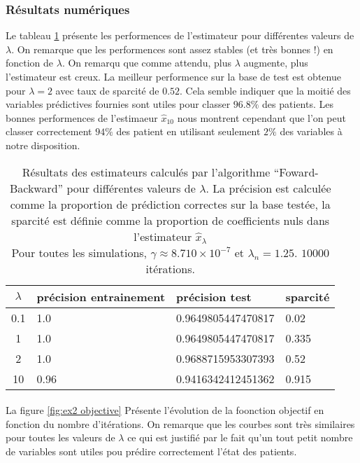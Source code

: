 \documentclass{article}
\newcommand{\xhat}{{\hat{x}}}
\begin{document}
\subsubsection{Résultats numériques}
Le tableau \ref{table:resultats ex2} présente les performences de l'estimateur pour différentes valeurs de $\lambda$. On remarque que les performences sont assez stables (et très bonnes !) en fonction de $\lambda$. On remarqu que comme attendu, plus $\lambda$ augmente, plus l'estimateur est creux. La meilleur performence sur la base de test est obtenue pour $\lambda = 2$ avec taux de sparcité de $0.52$. Cela semble indiquer que la moitié des variables prédictives fournies sont utiles pour classer $96.8\%$ des patients. Les bonnes performences de l'estimaeur $\xhat_10$ nous montrent cependant que l'on peut classer correctement $94\%$ des patient en utilisant seulement $2\%$ des variables à notre disposition.

\begin{table}[ht]
  \centering
  \begin{tabular}{c|l|l|l}
    \hline
    $\lambda$ & précision entrainement & précision test & sparcité\\
    \hline
    0.1 & 1.0 & 0.9649805447470817 & 0.02 \\
    1 & 1.0 & 0.9649805447470817  & 0.335\\
    2 & 1.0  &  0.9688715953307393 & 0.52\\
    10& 0.96 & 0.9416342412451362 & 0.915\\

  \end{tabular}
  \caption{Résultats des estimateurs calculés par l'algorithme ``Foward-Backward'' pour différentes valeurs de $\lambda$. La précision est calculée comme la proportion de prédiction correctes sur la base testée, la sparcité est définie comme la proportion de coefficients nuls dans l'estimateur $\xhat_\lambda$ \\Pour toutes les simulations, $\gamma \approx 8.710\times 10^{-7}$ et $\lambda_n = 1.25$. $10000$ itérations.}
  \label{table:resultats ex2}
\end{table}

\paragraph{}
La figure \ref{fig:ex2 objective} Présente l'évolution de la foonction objectif en fonction du nombre d'itérations. On remarque que les courbes sont très similaires pour toutes les valeurs de $\lambda$ ce qui est justifié par le fait qu'un tout petit nombre de variables sont utiles pou prédire correctement l'état des patients.
\end{document}
